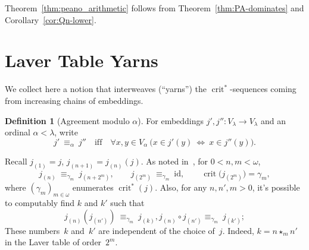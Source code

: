 \documentclass{article}
\theoremstyle{definition}
\newtheorem{definition}[lemma]{Definition}
\theoremstyle{remark}
\DeclareMathOperator{\crit}{crit}
\begin{document}
Theorem~\ref{thm:peano_arithmetic} follows from Theorem~\ref{thm:PA-dominates} and Corollary~\ref{cor:Qn-lower}. 










\bigskip
\section{Laver Table Yarns}
\label{sec:laver_table_yarns}

We collect here a notion that interweaves (``yarns'') the $\crit^*$-sequences coming from increasing chains of embeddings.

\begin{definition}[Agreement modulo $\alpha$]\label{def:equiv-alpha}
For embeddings $j',j'':V_\lambda\to V_\lambda$ and an ordinal $\alpha<\lambda$, write
\[
j'\ \equiv_\alpha\ j''\quad\text{iff}\quad
\forall x,y\in V_\alpha\ \bigl( x\in j'(y)\ \Longleftrightarrow\ x\in j''(y)\bigr).
\]
\end{definition}

Recall $j_{(1)}=j$, $j_{(n+1)}=j_{(n)}(j)$. As noted in~\cite{Dougherty}, for $0<n,m<\omega$,
\[
j_{(n)}\ \equiv_{\gamma_m}\ j_{(n+2^m)},\qquad
j_{(2^m)}\ \equiv_{\gamma_m}\ \mathrm{id},\qquad \crit\bigl(j_{(2^m)}\bigr)=\gamma_m,
\]
where $(\gamma_m)_{m\in \omega}$ enumerates $\crit^*(j)$. Also, for any $n,n',m>0$, it's possible to computably find $k$ and $k'$ such that \[j_{(n)}(j_{(n')})\ \equiv_{\gamma_m}\ j_{(k)}, j_{(n)}\circ j_{(n')}\equiv_{\gamma_m}\ j_{(k')};\] These numbers~$k$ and~$k'$ are independent of the choice of~$j$. Indeed, $k=n\star_m n'$ in the Laver table of order~$2^m$.
\end{document}
